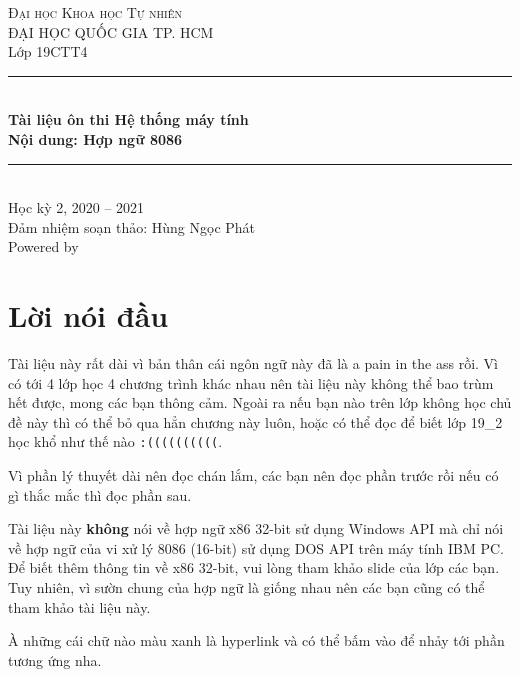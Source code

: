 \documentclass[12pt]{report}
\newcommand{\cd}[1]{\texttt{#1}}
\begin{document}
\begin{titlepage}
    \vspace*{\fill}

    \centering
    \textsc{\LARGE Đại học Khoa học Tự nhiên}\\[0.5cm]
    \textsc{\large ĐẠI HỌC QUỐC GIA TP. HCM}\\[0.5cm]
    
    {\Large Lớp 19CTT4}\\[1.5cm]

    \rule{\textwidth}{0.4pt} \\[0.4cm]
    {
        \huge \bfseries Tài liệu ôn thi Hệ thống máy tính\\
        Nội dung: Hợp ngữ 8086
    }
    \rule{\textwidth}{0.4pt}\\[1.5cm]
    
    {\Large Học kỳ 2, 2020 -- 2021}\\[1.5cm]
    {\large Đảm nhiệm soạn thảo: Hùng Ngọc Phát \\
    Powered by \LaTeXe}
    \vspace*{\fill}

\end{titlepage}


\section*{Lời nói đầu}
Tài liệu này rất dài vì bản thân cái ngôn ngữ này đã là a pain in the ass rồi. Vì có tới 4 lớp học 4 chương trình khác nhau nên tài liệu này không thể bao trùm hết được, mong các bạn thông cảm. Ngoài ra nếu bạn nào trên lớp không học chủ đề này thì có thể bỏ qua hẳn chương này luôn, hoặc có thể đọc để biết lớp 19\_2 học khổ như thế nào \cd{:((((((((((}.\bigskip

Vì phần lý thuyết dài nên đọc chán lắm, các bạn nên đọc phần  trước rồi nếu có gì thắc mắc thì đọc phần  sau. \bigskip

Tài liệu này \textbf{không} nói về hợp ngữ x86 32-bit sử dụng Windows API mà chỉ nói về hợp ngữ của vi xử lý 8086 (16-bit) sử dụng DOS API trên máy tính IBM PC. Để biết thêm thông tin về x86 32-bit, vui lòng tham khảo slide của lớp các bạn. Tuy nhiên, vì sườn chung của hợp ngữ là giống nhau nên các bạn cũng có thể tham khảo tài liệu này.\bigskip

À những cái chữ nào màu xanh là hyperlink và có thể bấm vào để nhảy tới phần tương ứng nha.\bigskip
\end{document}
